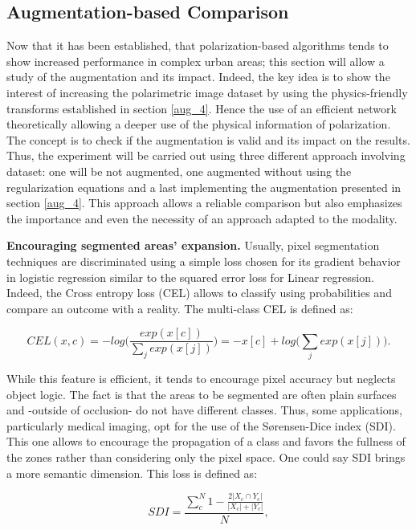 \subsection{Augmentation-based Comparison}\label{abc}

Now that it has been established, that polarization-based algorithms tends to show increased performance in complex urban areas; this section will allow a study of the augmentation and its impact.
Indeed, the key idea is to show the interest of increasing the polarimetric image dataset by using the physics-friendly transforms established in section \ref{aug_4}.
Hence the use of an efficient network theoretically allowing a deeper use of the physical information of polarization.
The concept is to check if the augmentation is valid and its impact on the results. Thus, the experiment will be carried out using three different approach involving dataset: one will be not augmented, one augmented without using the regularization equations and a last implementing the augmentation presented in section \ref{aug_4}.
This approach allows a reliable comparison but also emphasizes the importance and even the necessity of an approach adapted to the modality.

\textbf{Encouraging segmented areas' expansion. } Usually, pixel segmentation techniques are discriminated using a simple loss chosen for its gradient behavior in logistic regression similar to the squared error loss for Linear regression. Indeed, the Cross entropy loss (CEL) allows to classify using probabilities and compare an outcome with a reality.
The multi-class CEL is defined as:

\begin{equation}
	CEL(x,c) = -log\Big( \frac{exp(x[c])}{\sum_j exp(x[j])} \Big) = -x[c] + log\Big( \sum_j exp(x[j]) \Big).
\end{equation}

While this feature is efficient, it tends to encourage pixel accuracy but neglects object logic. The fact is that the areas to be segmented are often plain surfaces and -outside of occlusion- do not have different classes. Thus, some applications, particularly medical imaging, opt for the use of the S\o rensen-Dice index (SDI). This one allows to encourage the propagation of a class and favors the fullness of the zones rather than considering only the pixel space. One could say SDI brings a more semantic dimension. This loss is defined as:

\begin{equation}
SDI =\frac{ \sum^{N}_{c} 1 - \frac{2 | X_c \cap Y_c|}{|X_c| + |Y_c|}}{N},\label{eq_dice}
\end{equation}

